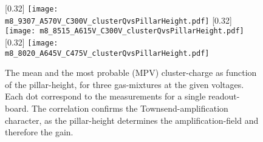 \documentclass[
twoside,            %
BCOR1.4cm,          %
10pt,               %
headings=normal,    %
headsepline,        %
clearplainpage,		%
final,              %
div=14,
open=right,
bibliography=toc
]{scrreprt}
\begin{document}
\begin{figure}[!h]
	\centering
	[0.32\textwidth]
	{\texttt{[image: m8\_9307\_A570V\_C300V\_clusterQvsPillarHeight.pdf]}}
	\hfill
	[0.32\textwidth]
	{\texttt{[image: m8\_8515\_A615V\_C300V\_clusterQvsPillarHeight.pdf]}}
	\hfill
	[0.32\textwidth]
	{\texttt{[image: m8\_8020\_A645V\_C475V\_clusterQvsPillarHeight.pdf]}}
	\vspace{-2mm}
	\caption{
		The mean and the most probable (MPV) cluster-charge as function of the pillar-height, for three gas-mixtures at the given voltages.
		Each dot correspond to the measurements for a single readout-board.
		The correlation confirms the Townsend-amplification character, as the pillar-height determines the amplification-field and therefore the gain.
	}
	\label{clusterQvsPillarHeight} 
\end{figure}
\end{document}
